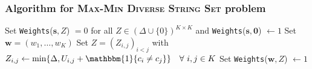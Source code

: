 \documentclass{beamer}
\begin{document}
\begin{frame}
    \frametitle{Algorithm for \textsc{Max-Min Diverse String Set} problem}
    \begin{algorithm}[H] \label{alg:dp}
        \footnotesize{\caption{}}
        \footnotesize{\begin{algorithmic}[1]
            \State Set \texttt{Weights}($\mathbf{s}, Z$) $=0$ for all $Z \in (\Delta \cup \{0\})^{K \times K}$ and \texttt{Weights}($\mathbf{s}, \mathbf{0}$) $\gets 1$
                        \State Set $\mathbf{w} = (w_1, \dots, w_K)$
                            \State Set $Z = (Z_{i,j})_{i<j}$ with $Z_{i,j} \gets \min \{\Delta, U_{i,j} + \mathbbm{1}\{c_i \neq c_j\}\} \quad \forall ~ i, j \in K$
                            \State Set \texttt{Weights}($\mathbf{w}, Z$) $\gets 1$ 

\end{algorithmic}}
\end{algorithm}
\end{frame}
\end{document}
